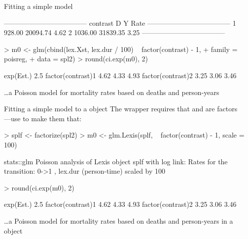 \begin{frame}[fragile]{Fitting a simple model}
\begin{Schunk}
\begin{Soutput}
 ------------------------------------ 
 contrast         D        Y    Rate  
 ------------------------------------ 
 1           928.00 20094.74    4.62  
 2          1036.00 31839.35    3.25  
 ------------------------------------ 
\end{Soutput}
\end{Schunk}
\begin{Schunk}
\begin{Sinput}
> m0 <- glm(cbind(lex.Xst, lex.dur / 100) ~ factor(contrast) - 1,
+           family = poisreg,
+             data = spl2)
> round(ci.exp(m0), 2)
\end{Sinput}
\begin{Soutput}
                  exp(Est.) 2.5%
factor(contrast)1      4.62 4.33  4.93
factor(contrast)2      3.25 3.06  3.46
\end{Soutput}
\end{Schunk}
\small
\ldots a Poisson model for mortality rates based on deaths and person-years
\end{frame}

\begin{frame}[fragile]{Fitting a simple model to a  object}
\small
The wrapper  requires that  and 
are factors\\---use  to make them that:
\vspace*{-1ex}
\begin{Schunk}
\begin{Sinput}
> splf <- factorize(spl2)
> m0 <- glm.Lexis(splf, ~ factor(contrast) - 1, scale = 100)
\end{Sinput}
\begin{Soutput}
stats::glm Poisson analysis of Lexis object splf with log link:
Rates for the transition:
0->1
, lex.dur (person-time) scaled by 100
\end{Soutput}
\begin{Sinput}
> round(ci.exp(m0), 2)
\end{Sinput}
\begin{Soutput}
                  exp(Est.) 2.5%
factor(contrast)1      4.62 4.33  4.93
factor(contrast)2      3.25 3.06  3.46
\end{Soutput}
\end{Schunk}
\small
\ldots a Poisson model for mortality rates based on deaths and
person-years in a  object
\end{frame}

